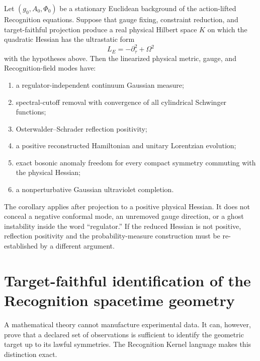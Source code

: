 \begin{corollary}
\label{cor:constructive-physical-sector}
Let $(g_0,A_0,\Phi_0)$ be a stationary Euclidean background of the action-lifted Recognition equations.  Suppose that gauge fixing, constraint reduction, and target-faithful projection produce a real physical Hilbert space $K$ on which the quadratic Hessian has the ultrastatic form
\[
L_E=-\partial_\tau^2+\Omega^2
\]
with the hypotheses above.  Then the linearized physical metric, gauge, and Recognition-field modes have:
\begin{enumerate}[label=(\roman*)]
\item a regulator-independent continuum Gaussian measure;
\item spectral-cutoff removal with convergence of all cylindrical Schwinger functions;
\item Osterwalder--Schrader reflection positivity;
\item a positive reconstructed Hamiltonian and unitary Lorentzian evolution;
\item exact bosonic anomaly freedom for every compact symmetry commuting with the physical Hessian;
\item a nonperturbative Gaussian ultraviolet completion.
\end{enumerate}
\end{corollary}

\begin{remark}
The corollary applies after projection to a positive physical Hessian.  It does not conceal a negative conformal mode, an unremoved gauge direction, or a ghost instability inside the word ``regulator.''  If the reduced Hessian is not positive, reflection positivity and the probability-measure construction must be re-established by a different argument.
\end{remark}

\section{Target-faithful identification of the Recognition spacetime geometry}
\label{sec:metric-identification}

A mathematical theory cannot manufacture experimental data.  It can, however, prove that a declared set of observations is sufficient to identify the geometric target up to its lawful symmetries.  The Recognition Kernel language makes this distinction exact.

